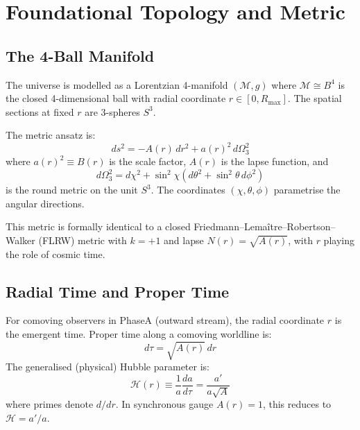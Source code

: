 \documentclass[10pt,twocolumn]{article}
\theoremstyle{definition}
\newcommand{\Rmax}{R_{\max}}
\newcommand{\Hcal}{\mathcal{H}}
\newcommand{\dOmega}{d\Omega_{3}^{2}}
\begin{document}
\section{Foundational Topology and Metric}
\label{sec:topology}

\subsection{The 4-Ball Manifold}

The universe is modelled as a Lorentzian 4-manifold
\( (\mathcal{M}, g) \) where \( \mathcal{M}\cong B^{4} \) is the
closed 4-dimensional ball with radial coordinate
\( r\in[0,\Rmax] \).  The spatial sections at fixed \( r \) are
3-spheres \( S^{3} \).

The metric ansatz is:
\begin{equation}
  ds^{2} = -A(r)\,dr^{2} + a(r)^{2}\,\dOmega
  \label{eq:metric}
\end{equation}
where \( a(r)^{2}\equiv B(r) \) is the scale factor,
\( A(r) \) is the lapse function, and
\begin{equation}
  \dOmega = d\chi^{2}
    + \sin^{2}\!\chi\!\left(d\theta^{2}
    + \sin^{2}\!\theta\,d\phi^{2}\right)
\end{equation}
is the round metric on the unit \( S^{3} \).  The coordinates
\( (\chi,\theta,\phi) \) parametrise the angular directions.

This metric is formally identical to a closed
Friedmann--Lema\^{i}tre--Robertson--Walker (FLRW) metric
with \( k=+1 \) and lapse \( N(r)=\sqrt{A(r)} \), with \( r \)
playing the role of cosmic time.



\subsection{Radial Time and Proper Time}

For comoving observers in Phase\nobreakspace{}A (outward stream), the
radial coordinate \( r \) is the emergent time.  Proper time
along a comoving worldline is:
\begin{equation}
  d\tau = \sqrt{A(r)}\,dr
\end{equation}
The generalised (physical) Hubble parameter is:
\begin{equation}
  \Hcal(r) \equiv \frac{1}{a}\frac{da}{d\tau}
  = \frac{a'}{a\sqrt{A}}
  \label{eq:H-def}
\end{equation}
where primes denote \( d/dr \).  In synchronous gauge
\( A(r)=1 \), this reduces to \( \Hcal = a'/a \).
\end{document}
